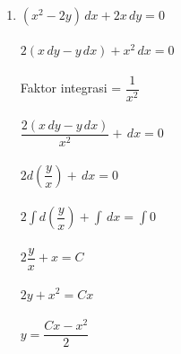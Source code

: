 \begin{enumerate}[1.]
	\item \begin{math} (x^{2} - 2y) \, dx + 2x \, dy = 0 \end{math} \\ \\
	\begin{math} 2(x \,dy - y \, dx) + x^{2} \, dx = 0 \end{math} \\ \\
	Faktor integrasi = \begin{math} \dfrac{1}{x^{2}} \end{math} \\ \\
	\begin{math} \dfrac{2(x \,dy - y \, dx)}{x^{2}}  + \, dx = 0 \end{math} \\ \\
	\begin{math} 2 d(\dfrac{y}{x}) + \, dx = 0\end{math} \\ \\
	\begin{math} 2 \int d(\dfrac{y}{x}) + \int \, dx = \int 0 \end{math} \\ \\
	\begin{math} 2 \dfrac{y}{x} + x = C \end{math} \\ \\
	\begin{math} 2y + x^{2} = Cx \end{math} \\ \\
	\begin{math}y = \dfrac{Cx - x^{2}}{2} \end{math}


\end{enumerate}
